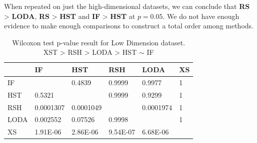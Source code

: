 When repeated on just the high-dimensional datasets, we can conclude that \textbf{RS} > \textbf{LODA}, \textbf{RS} > \textbf{HST} and \textbf{IF} > \textbf{HST} at $p=0.05$. We do not have enough evidence to make enough comparisons to construct a total order among methods.


 \begin{table}
 \centering
     \begin{tabular}{|l|lllll|}
     \hline
        & IF        & HST       & RSH      & LODA      & XS \\	\hline
    IF   & ~         & 0.4839    & 0.9999   & 0.9977    & 1  \\
    HST  & 0.5321    & ~         & 0.9999   & 0.9299    & 1  \\
    RSH  & 0.0001307 & 0.0001049 & ~        & 0.0001974 & 1  \\
    LODA & 0.002552  & 0.07526   & 0.9998   & ~         & 1  \\
    XS   & 1.91E-06  & 2.86E-06  & 9.54E-07 & 6.68E-06  & ~  \\
    \hline
\end{tabular}
     \caption{Wilcoxon test p-value result for Low Dimension dataset. XST > RSH > LODA > HST $\sim$ IF}
 \end{table}

